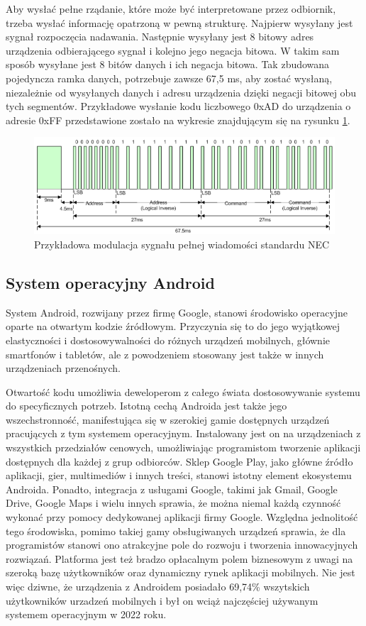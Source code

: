 \documentclass[12pt,twoside]{article}
\begin{document}
Aby wysłać pełne rządanie, które może być interpretowane przez odbiornik, trzeba wysłać informację opatrzoną w pewną strukturę. Najpierw wysyłany jest sygnał rozpoczęcia nadawania. Następnie wysyłany jest 8 bitowy adres urządzenia odbierającego sygnał i kolejno jego negacja bitowa. W takim sam sposób wysyłane jest 8 bitów danych i ich negacja bitowa. Tak zbudowana pojedyncza ramka danych, potrzebuje zawsze 67,5 ms, aby zostać wysłaną, niezależnie od wysyłanych danych i adresu urządzenia dzięki negacji bitowej obu tych segmentów. Przykładowe wysłanie kodu liczbowego 0xAD do urządzenia o adresie 0xFF przedstawione zostało na wykresie znajdującym się na rysunku \ref*{Fig:necFrame}.

\begin{figure}[ht]
   \centering
   \includegraphics[width=13cm]{images/necFrame.png}
   \caption{Przykładowa modulacja sygnału pełnej wiadomości standardu NEC}
   \label{Fig:necFrame}
\end{figure}

\subsection{System operacyjny Android}
System Android, rozwijany przez firmę Google, stanowi środowisko operacyjne oparte na otwartym kodzie źródłowym. Przyczynia się to do jego wyjątkowej elastyczności i dostosowywalności do różnych urządzeń mobilnych, głównie
smartfonów i tabletów, ale z powodzeniem stosowany jest także w innych urządzeniach przenośnych.

Otwartość kodu umożliwia deweloperom z całego świata dostosowywanie systemu do specyficznych potrzeb. Istotną cechą Androida jest także jego wszechstronność, manifestująca się w szerokiej gamie dostępnych
urządzeń pracujących z tym systemem operacyjnym.
Instalowany jest on na urządzeniach z wszystkich przedziałów cenowych, umożliwiając
programistom tworzenie aplikacji dostępnych dla każdej z grup odbiorców. Sklep Google Play, jako główne źródło
aplikacji, gier, multimediów i innych treści, stanowi istotny element ekosystemu Androida. Ponadto, integracja
z usługami Google, takimi jak Gmail, Google Drive, Google Maps i wielu innych sprawia, że można niemal każdą czynność wykonać przy pomocy dedykowanej aplikacji firmy Google. Względna jednolitość tego środowiska, pomimo takiej gamy obsługiwanych urządzeń sprawia, że dla programistów stanowi ono atrakcyjne pole do
rozwoju i tworzenia innowacyjnych rozwiązań. Platforma jest też bradzo opłacalnym polem biznesowym z uwagi na szeroką bazę użytkowników oraz dynamiczny rynek aplikacji mobilnych. Nie jest więc dziwne, że urządzenia z Androidem posiadało 69,74\% wszytskich użytkowników urzadzeń mobilnych i był on wciąż najczęściej używanym systemem operacyjnym w 2022 roku\cite{androidStats}.
\end{document}
